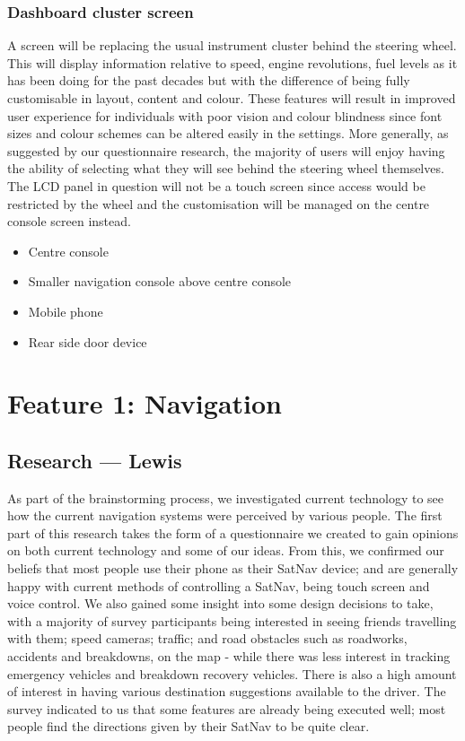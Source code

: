 \documentclass{article}
\begin{document}
\subsubsection{Dashboard cluster screen}\label{sssec:cluster-screen}
A screen will be replacing the usual instrument cluster behind the steering wheel. This will display information relative to speed, engine revolutions, fuel levels as it has been doing for the past decades but with the difference of being fully customisable in layout, content and colour. These features will result in improved user experience for individuals with poor vision and colour blindness since font sizes and colour schemes can be altered easily in the settings. More generally, as suggested by our questionnaire research, the majority of users will enjoy having the ability of selecting what they will see behind the steering wheel themselves. The LCD panel in question will not be a touch screen since access would be restricted by the wheel and the customisation will be managed on the centre console screen instead.

\begin{itemize}
  \item Centre console
  \item Smaller navigation console above centre console
  \item Mobile phone
  \item Rear side door device
\end{itemize}




%
%
\section{Feature 1: Navigation}\label{sec:nav}

\subsection{Research --- Lewis}\label{ssec:nav-research}
As part of the brainstorming process, we investigated current technology to see how the current navigation systems were perceived by various people. The first part of this research takes the form of a questionnaire we created to gain opinions on both current technology and some of our ideas. From this, we confirmed our beliefs that most people use their phone as their SatNav device; and are generally happy with current methods of controlling a SatNav, being touch screen and voice control. We also gained some insight into some design decisions to take, with a majority of survey participants being interested in seeing friends travelling with them; speed cameras; traffic; and road obstacles such as roadworks, accidents and breakdowns, on the map - while there was less interest in tracking emergency vehicles and breakdown recovery vehicles. There is also a high amount of interest in having various destination suggestions available to the driver. The survey  indicated to us that some features are already being executed well; most people find the directions given by their SatNav to be quite clear.
\end{document}
